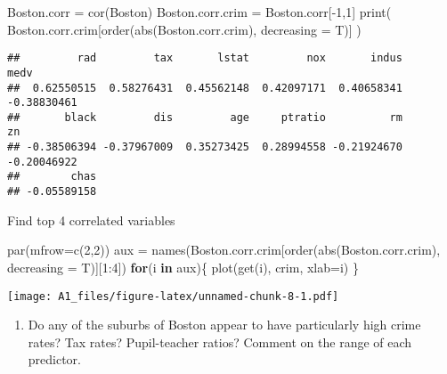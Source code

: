 \documentclass[
]{article}
\newenvironment{Shaded}{\begin{snugshade}}{\end{snugshade}}
\newcommand{\AttributeTok}[1]{\textcolor[rgb]{0.77,0.63,0.00}{#1}}
\newcommand{\ControlFlowTok}[1]{\textcolor[rgb]{0.13,0.29,0.53}{\textbf{#1}}}
\newcommand{\DecValTok}[1]{\textcolor[rgb]{0.00,0.00,0.81}{#1}}
\newcommand{\FunctionTok}[1]{\textcolor[rgb]{0.00,0.00,0.00}{#1}}
\newcommand{\NormalTok}[1]{#1}
\newcommand{\OtherTok}[1]{\textcolor[rgb]{0.56,0.35,0.01}{#1}}
\newcommand{\SpecialCharTok}[1]{\textcolor[rgb]{0.00,0.00,0.00}{#1}}
\providecommand{\tightlist}{%
  \setlength{\itemsep}{0pt}\setlength{\parskip}{0pt}}
\begin{document}
\begin{Shaded}
\begin{Highlighting}[]
\NormalTok{Boston.corr }\OtherTok{=} \FunctionTok{cor}\NormalTok{(Boston)}
\NormalTok{Boston.corr.crim }\OtherTok{=}\NormalTok{ Boston.corr[}\SpecialCharTok{{-}}\DecValTok{1}\NormalTok{,}\DecValTok{1}\NormalTok{]}
\FunctionTok{print}\NormalTok{(}
\NormalTok{  Boston.corr.crim[}\FunctionTok{order}\NormalTok{(}\FunctionTok{abs}\NormalTok{(Boston.corr.crim), }\AttributeTok{decreasing =}\NormalTok{ T)]}
\NormalTok{)}
\end{Highlighting}
\end{Shaded}

\begin{verbatim}
##         rad         tax       lstat         nox       indus        medv 
##  0.62550515  0.58276431  0.45562148  0.42097171  0.40658341 -0.38830461 
##       black         dis         age     ptratio          rm          zn 
## -0.38506394 -0.37967009  0.35273425  0.28994558 -0.21924670 -0.20046922 
##        chas 
## -0.05589158
\end{verbatim}

Find top 4 correlated variables

\begin{Shaded}
\begin{Highlighting}[]
\FunctionTok{par}\NormalTok{(}\AttributeTok{mfrow=}\FunctionTok{c}\NormalTok{(}\DecValTok{2}\NormalTok{,}\DecValTok{2}\NormalTok{))}
\NormalTok{aux }\OtherTok{=} \FunctionTok{names}\NormalTok{(Boston.corr.crim[}\FunctionTok{order}\NormalTok{(}\FunctionTok{abs}\NormalTok{(Boston.corr.crim), }\AttributeTok{decreasing =}\NormalTok{ T)][}\DecValTok{1}\SpecialCharTok{:}\DecValTok{4}\NormalTok{])}
\ControlFlowTok{for}\NormalTok{(i }\ControlFlowTok{in}\NormalTok{ aux)\{}
  \FunctionTok{plot}\NormalTok{(}\FunctionTok{get}\NormalTok{(i), crim, }\AttributeTok{xlab=}\NormalTok{i)}
\NormalTok{\}}
\end{Highlighting}
\end{Shaded}

\texttt{[image: A1\_files/figure-latex/unnamed-chunk-8-1.pdf]}

\begin{enumerate}
\def\labelenumi{(\alph{enumi})}
\setcounter{enumi}{3}
\tightlist
\item
  Do any of the suburbs of Boston appear to have particularly high crime
  rates? Tax rates? Pupil-teacher ratios? Comment on the range of each
  predictor.
\end{enumerate}
\end{document}
